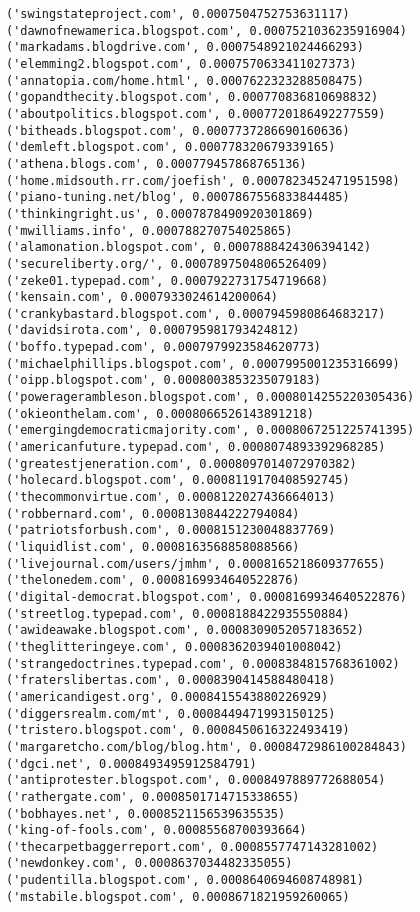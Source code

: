 \documentclass[11pt]{article}
\begin{document}
\begin{Verbatim}[commandchars=\\\{\}]
('swingstateproject.com', 0.0007504752753631117)
('dawnofnewamerica.blogspot.com', 0.0007521036235916904)
('markadams.blogdrive.com', 0.0007548921024466293)
('elemming2.blogspot.com', 0.0007570633411027373)
('annatopia.com/home.html', 0.0007622323288508475)
('gopandthecity.blogspot.com', 0.000770836810698832)
('aboutpolitics.blogspot.com', 0.0007720186492277559)
('bitheads.blogspot.com', 0.0007737286690160636)
('demleft.blogspot.com', 0.000778320679339165)
('athena.blogs.com', 0.000779457868765136)
('home.midsouth.rr.com/joefish', 0.0007823452471951598)
('piano-tuning.net/blog', 0.0007867556833844485)
('thinkingright.us', 0.0007878490920301869)
('mwilliams.info', 0.000788270754025865)
('alamonation.blogspot.com', 0.0007888424306394142)
('secureliberty.org/', 0.0007897504806526409)
('zeke01.typepad.com', 0.0007922731754719668)
('kensain.com', 0.0007933024614200064)
('crankybastard.blogspot.com', 0.0007945980864683217)
('davidsirota.com', 0.000795981793424812)
('boffo.typepad.com', 0.0007979923584620773)
('michaelphillips.blogspot.com', 0.0007995001235316699)
('oipp.blogspot.com', 0.0008003853235079183)
('poweragerambleson.blogspot.com', 0.0008014255220305436)
('okieonthelam.com', 0.0008066526143891218)
('emergingdemocraticmajority.com', 0.0008067251225741395)
('americanfuture.typepad.com', 0.0008074893392968285)
('greatestjeneration.com', 0.0008097014072970382)
('holecard.blogspot.com', 0.0008119170408592745)
('thecommonvirtue.com', 0.0008122027436664013)
('robbernard.com', 0.0008130844222794084)
('patriotsforbush.com', 0.0008151230048837769)
('liquidlist.com', 0.0008163568858088566)
('livejournal.com/users/jmhm', 0.0008165218609377655)
('thelonedem.com', 0.0008169934640522876)
('digital-democrat.blogspot.com', 0.0008169934640522876)
('streetlog.typepad.com', 0.0008188422935550884)
('awideawake.blogspot.com', 0.0008309052057183652)
('theglitteringeye.com', 0.0008362039401008042)
('strangedoctrines.typepad.com', 0.0008384815768361002)
('fraterslibertas.com', 0.0008390414588480418)
('americandigest.org', 0.0008415543880226929)
('diggersrealm.com/mt', 0.0008449471993150125)
('tristero.blogspot.com', 0.0008450616322493419)
('margaretcho.com/blog/blog.htm', 0.0008472986100284843)
('dgci.net', 0.0008493495912584791)
('antiprotester.blogspot.com', 0.0008497889772688054)
('rathergate.com', 0.0008501714715338655)
('bobhayes.net', 0.0008521156539635535)
('king-of-fools.com', 0.00085568700393664)
('thecarpetbaggerreport.com', 0.0008557747143281002)
('newdonkey.com', 0.0008637034482335055)
('pudentilla.blogspot.com', 0.0008640694608748981)
('mstabile.blogspot.com', 0.0008671821959260065)

\end{Verbatim}
\end{document}
